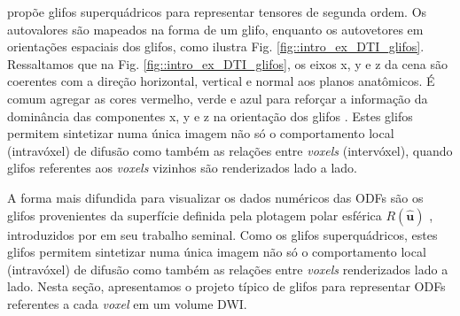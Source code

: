 \documentclass[
    12pt,                %
    oneside,            %
    a4paper,            %
    english,            %
    french,                %
    spanish,            %
    brazil                %
    ]{abntex2}
\begin{document}

  propõe glifos superquádricos para representar tensores de segunda ordem. Os autovalores são mapeados na forma de um glifo, enquanto os autovetores em orientações espaciais dos glifos, como ilustra Fig. \ref{fig::intro_ex_DTI_glifos}. Ressaltamos que na Fig. \ref{fig::intro_ex_DTI_glifos}, os eixos x, y e z da cena são coerentes com a direção horizontal, vertical e normal aos planos anatômicos. É comum agregar as cores vermelho, verde e azul para reforçar a informação da dominância das componentes x, y e z na orientação dos glifos \cite{pajevic2000}. Estes glifos permitem sintetizar numa única imagem não só o comportamento local (intravóxel) de difusão como também as relações entre \textit{voxels} (intervóxel), quando glifos referentes aos \textit{voxels} vizinhos são renderizados lado a lado.

A forma mais difundida para visualizar os dados numéricos das ODFs são os glifos provenientes da superfície definida pela plotagem polar esférica $R(\mathbf{\hat{u}})$ \cite{descoteaux2015, TuchQBall2004}, introduzidos por  em seu trabalho seminal. Como os glifos superquádricos, estes glifos permitem sintetizar numa única imagem não só o comportamento local (intravóxel) de difusão como também as relações entre \textit{voxels} renderizados lado a lado.
Nesta seção, apresentamos o projeto típico de glifos para representar ODFs referentes a cada \textit{voxel} em um volume DWI.

\end{document}
